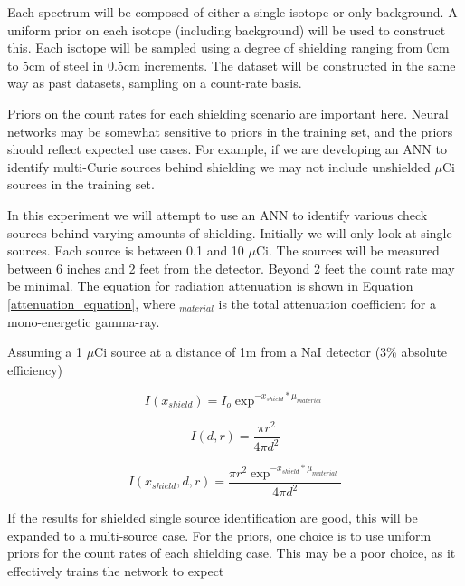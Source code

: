 \documentclass[thesis,tocnosub,noragright,centerchapter,12pt,fullpage]{uiucecethesis09}
\begin{document}
Each spectrum will be composed of either a single isotope or only background. A uniform prior on each isotope (including background) will be used to construct this. Each isotope will be sampled using a degree of shielding ranging from 0cm to 5cm of steel in 0.5cm increments. The dataset will be constructed in the same way as past datasets, sampling on a count-rate basis.

Priors on the count rates for each shielding scenario are important here. Neural networks may be somewhat sensitive to priors in the training set, and the priors should reflect expected use cases. For example, if we  are developing an ANN to identify multi-Curie sources behind shielding we may not include unshielded $\mu$Ci sources in the training set.

In this experiment we will attempt to use an ANN to identify various check sources behind varying amounts of shielding. Initially we will only look at single sources. Each source is between 0.1 and 10 $\mu$Ci. The sources will be measured between 6 inches and 2 feet from the detector. Beyond 2 feet the count rate may be minimal. The equation for radiation attenuation is shown in Equation \ref{attenuation_equation}, where \mu$_{material}$ is the  total attenuation coefficient for a mono-energetic gamma-ray. 

Assuming a 1 $\mu$Ci source at a distance of 1m from a NaI detector (3\% absolute efficiency)  

\begin{equation} \label{attenuation_equation}
I(x_{shield}) = I_o \exp^{-x_{shield}*\mu_{material}}
\end{equation}

\begin{equation} \label{geometric_eff}
I(d,r) = \frac{\pi r^2}{4 \pi d^2}
\end{equation}

\begin{equation} \label{total_eff}
I(x_{shield},d,r) = \frac{\pi r^2 \exp^{-x_{shield}*\mu_{material}} }{4 \pi d^2}
\end{equation}




If the results for shielded single source identification are good, this will be expanded to a multi-source case. For the priors, one choice is to use uniform priors for the count rates of each shielding case. This may be a poor choice, as it effectively trains the network to expect 

\end{document}
